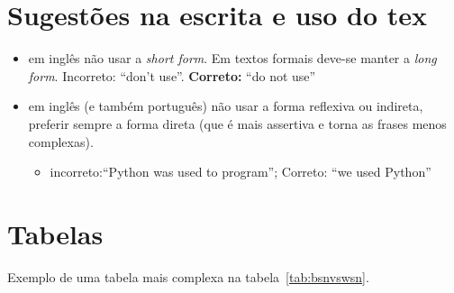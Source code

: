 \section{Sugestões na escrita e uso do tex}
\begin{itemize}
  \item em inglês não usar a \emph{short form}. Em textos formais deve-se manter a \emph{long form}. Incorreto: ``don't use''. \textbf{Correto:} ``do not use''
  \item em inglês (e também português) não usar a forma reflexiva ou indireta, preferir sempre a forma direta (que é mais assertiva e torna as frases menos complexas).
     \begin{itemize}
        \item incorreto:``Python was used to program''; Correto: ``we used Python''
     \end{itemize}
\end{itemize}

\section{Tabelas}
Exemplo de uma tabela mais complexa na tabela~\ref{tab:bsnvswsn}.

